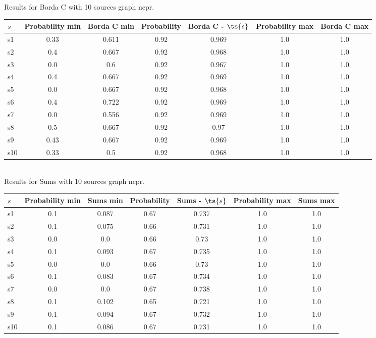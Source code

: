 \documentclass{article}
\begin{document}
\noindent Results for Borda C with 10 sources graph ncpr.

\noindent\begin{tabular}{|l|c|c|c|c|c|c|}
\hline
$s$& Probability min & Borda C min & Probability & Borda C - $\ts{s}$ & Probability max & Borda C max\\
\hline
s1 &0.33 & 0.611 & 0.92 & 0.969 & 1.0 & 1.0\\
\hline
s2 &0.4 & 0.667 & 0.92 & 0.968 & 1.0 & 1.0\\
\hline
s3 &0.0 & 0.6 & 0.92 & 0.967 & 1.0 & 1.0\\
\hline
s4 &0.4 & 0.667 & 0.92 & 0.969 & 1.0 & 1.0\\
\hline
s5 &0.0 & 0.667 & 0.92 & 0.968 & 1.0 & 1.0\\
\hline
s6 &0.4 & 0.722 & 0.92 & 0.969 & 1.0 & 1.0\\
\hline
s7 &0.0 & 0.556 & 0.92 & 0.969 & 1.0 & 1.0\\
\hline
s8 &0.5 & 0.667 & 0.92 & 0.97 & 1.0 & 1.0\\
\hline
s9 &0.43 & 0.667 & 0.92 & 0.969 & 1.0 & 1.0\\
\hline
s10 &0.33 & 0.5 & 0.92 & 0.968 & 1.0 & 1.0\\
\hline
\end{tabular}\\

\noindent Results for Sums with 10 sources graph ncpr.

\noindent\begin{tabular}{|l|c|c|c|c|c|c|}
\hline
$s$& Probability min & Sums min & Probability & Sums - $\ts{s}$ & Probability max & Sums max\\
\hline
s1 &0.1 & 0.087 & 0.67 & 0.737 & 1.0 & 1.0\\
\hline
s2 &0.1 & 0.075 & 0.66 & 0.731 & 1.0 & 1.0\\
\hline
s3 &0.0 & 0.0 & 0.66 & 0.73 & 1.0 & 1.0\\
\hline
s4 &0.1 & 0.093 & 0.67 & 0.735 & 1.0 & 1.0\\
\hline
s5 &0.0 & 0.0 & 0.66 & 0.73 & 1.0 & 1.0\\
\hline
s6 &0.1 & 0.083 & 0.67 & 0.734 & 1.0 & 1.0\\
\hline
s7 &0.0 & 0.0 & 0.67 & 0.738 & 1.0 & 1.0\\
\hline
s8 &0.1 & 0.102 & 0.65 & 0.721 & 1.0 & 1.0\\
\hline
s9 &0.1 & 0.094 & 0.67 & 0.732 & 1.0 & 1.0\\
\hline
s10 &0.1 & 0.086 & 0.67 & 0.731 & 1.0 & 1.0\\
\hline
\end{tabular}\\
\end{document}
